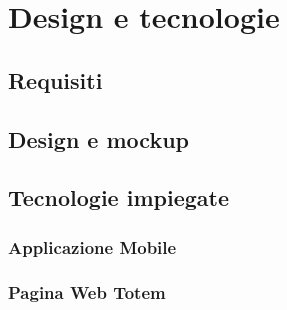 \chapter{Design e tecnologie}
\section{Requisiti}
\section{Design e mockup}
\section{Tecnologie impiegate}
\subsection{Applicazione Mobile}
\subsection{Pagina Web Totem}